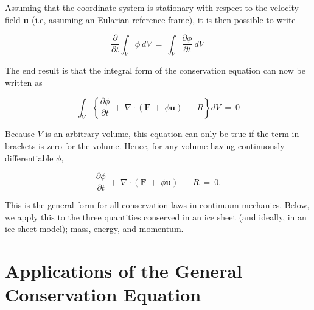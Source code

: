 Assuming that the coordinate system is stationary with respect to the velocity field $\mathbf{u}$ 
(i.e, assuming an Eularian reference frame), it is then possible to write

\begin{equation}
{\frac{ \partial}{ \partial t}} { \int }_{ V} \phi ~dV~ = ~{ \int }_{ V}
    {\frac{ \partial \phi }{ \partial t}} ~dV~
\end{equation}

The end result is that the integral form of the conservation equation can now be written as

\begin{equation}
{ \int }_{ V} \left\{ {{\frac{ \partial \phi }{ \partial t}}
    ~ + ~ \nabla {\cdot} \left ( { {\mathbf F}~ + ~ \phi {\mathbf u}} \right ) ~
    - ~ R} \right\} dV~ = ~ 0
\end{equation}

Because $V$ is an arbitrary volume, this equation can only be true if the term in brackets is zero 
for the volume. Hence, for any volume having continuously differentiable $\phi$,

\begin{equation}
{\frac{ \partial \phi }{ \partial t}} ~ + ~ \nabla {\cdot} 
    \left ( { {\mathbf F}~ + ~ \phi {\mathbf u}} \right ) ~ - ~R~ = ~ 0.
    \label{eq:derivcons}
\end{equation}

This is the general form for all conservation laws in continuum mechanics. Below, we apply this to the three quantities conserved in an 
ice sheet (and ideally, in an ice sheet model); mass, energy, and momentum.

\section{Applications of the General Conservation Equation}








